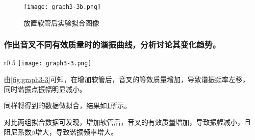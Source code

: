 \documentclass[dvipsnames, svgnames,a4paper,11pt]{article}
\begin{document}
	\begin{figure}[htbp]
		\centering
		\texttt{[image: graph3-3b.png]}\label{fig:graph3-3b}
		\caption{放置软管后实验拟合图像}
	\end{figure}





	\subsubsection{作出音叉不同有效质量时的谐振曲线，分析讨论其变化趋势。}
		


	




	\begin{wrapfigure}{r}{0.5\textwidth}
		\centering
		\texttt{[image: graph3-3.png]}
		\label{fig:graph3-3}
		\caption{不同有效质量对比图}
	  \end{wrapfigure}

	由\cref{fig:graph3-3}可知，在增加软管后，音叉的等效质量增加，导致谐振频率左移，同时谐振点振幅明显减小。

			
	同样将得到的数据做拟合，结果如\cref{fig:graph3-3b}所示。

	


	对比两组拟合数据可发现，增加软管后，音叉的有效质量增加，导致振幅减小，且阻尼系数$\beta$增大，导致谐振频率增大。
			
\end{document}
